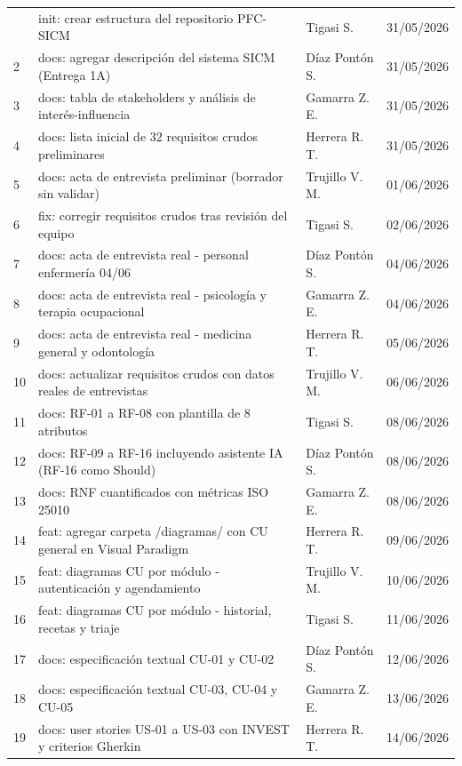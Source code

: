 \documentclass[11pt,a4paper]{article}
\begin{document}
\begin{longtable}{p{} p{} p{} p{}}
		\bottomrule
		\endlastfoot
		1 & init: crear estructura del repositorio PFC-SICM & Tigasi S. & 31/05/2026 \\
		2 & docs: agregar descripción del sistema SICM (Entrega 1A) & Díaz Pontón S. & 31/05/2026 \\
		3 & docs: tabla de stakeholders y análisis de interés-influencia & Gamarra Z. E. & 31/05/2026 \\
		4 & docs: lista inicial de 32 requisitos crudos preliminares & Herrera R. T. & 31/05/2026 \\
		5 & docs: acta de entrevista preliminar (borrador sin validar) & Trujillo V. M. & 01/06/2026 \\
		6 & fix: corregir requisitos crudos tras revisión del equipo & Tigasi S. & 02/06/2026 \\
		7 & docs: acta de entrevista real - personal enfermería 04/06 & Díaz Pontón S. & 04/06/2026 \\
		8 & docs: acta de entrevista real - psicología y terapia ocupacional & Gamarra Z. E. & 04/06/2026 \\
		9 & docs: acta de entrevista real - medicina general y odontología & Herrera R. T. & 05/06/2026 \\
		10 & docs: actualizar requisitos crudos con datos reales de entrevistas & Trujillo V. M. & 06/06/2026 \\
		11 & docs: RF-01 a RF-08 con plantilla de 8 atributos & Tigasi S. & 08/06/2026 \\
		12 & docs: RF-09 a RF-16 incluyendo asistente IA (RF-16 como Should) & Díaz Pontón S. & 08/06/2026 \\
		13 & docs: RNF cuantificados con métricas ISO 25010 & Gamarra Z. E. & 08/06/2026 \\
		14 & feat: agregar carpeta /diagramas/ con CU general en Visual Paradigm & Herrera R. T. & 09/06/2026 \\
		15 & feat: diagramas CU por módulo - autenticación y agendamiento & Trujillo V. M. & 10/06/2026 \\
		16 & feat: diagramas CU por módulo - historial, recetas y triaje & Tigasi S. & 11/06/2026 \\
		17 & docs: especificación textual CU-01 y CU-02 & Díaz Pontón S. & 12/06/2026 \\
		18 & docs: especificación textual CU-03, CU-04 y CU-05 & Gamarra Z. E. & 13/06/2026 \\
		19 & docs: user stories US-01 a US-03 con INVEST y criterios Gherkin & Herrera R. T. & 14/06/2026 \\

\end{longtable}
\end{document}
